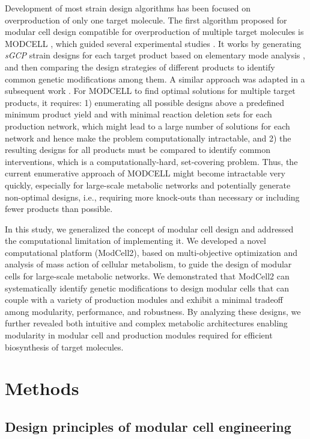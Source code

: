 Development of most strain design algorithms has been focused on overproduction of only one target molecule.
The first algorithm proposed for modular cell design compatible for overproduction of multiple target molecules is MODCELL \citep{trinh2015}, which guided several experimental studies \citep{layton2016, layton2014, layton2016b, wierzbicki2016, wilbanks2017}.
It works by generating \emph{sGCP} strain designs for each target product based on elementary mode analysis \citep{trinh2009b}, and then comparing the design strategies of different products to identify common genetic modifications among them.
A similar approach was adapted in a subsequent work \citep{jouhten2016}.
For MODCELL to find optimal solutions for multiple target products, it requires: 1) enumerating all possible designs above a predefined minimum product yield and with minimal reaction deletion sets for each production network, which might lead to a large number of solutions for each network and hence make the problem computationally intractable, and 2) the resulting designs for all products must be compared to identify common interventions, which is a computationally-hard, set-covering problem.
Thus, the current enumerative approach of MODCELL might become intractable very quickly, especially for large-scale metabolic networks and potentially generate non-optimal designs, i.e., requiring more knock-outs than necessary or including fewer products than possible.

In this study, we generalized the concept of modular cell design and addressed the computational limitation of implementing it.
We developed a novel computational platform (ModCell2), based on multi-objective optimization and analysis of mass action of cellular metabolism, to guide the design of modular cells for large-scale metabolic networks.
We demonstrated that ModCell2 can systematically identify genetic modifications to design modular cells that can couple with a variety of production modules and exhibit a minimal tradeoff among modularity, performance, and robustness.
By analyzing these designs, we further revealed both intuitive and complex metabolic architectures enabling modularity in modular cell and production modules required for efficient biosynthesis of target molecules.


\section{Methods}

\subsection{Design principles of modular cell
engineering}

